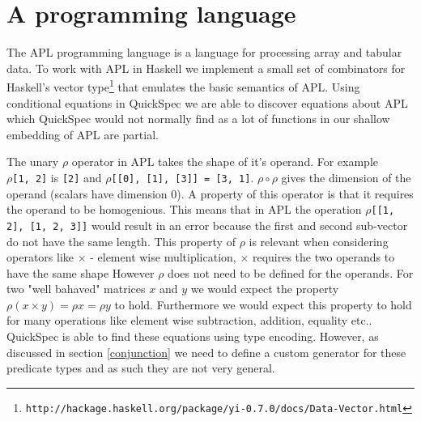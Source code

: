 \section{A programming language}\label{apl}
The APL programming language\cite{Iverson1962}\cite{APLdic}
is a language for processing array and tabular data.
To work with APL in Haskell we implement a small
set of combinators for Haskell's vector
type\footnote{\texttt{http://hackage.haskell.org/package/yi-0.7.0/docs/Data-Vector.html}}
that emulates the basic semantics of APL.
Using conditional equations in QuickSpec we are able to discover
equations about APL which QuickSpec would not
normally find as a lot of functions in our
shallow embedding of APL are partial\cite{Claessen2010}.

The unary $\rho$ operator in APL takes the shape of it's operand.
For example \\$\rho$\texttt{[1, 2]} is \texttt{[2]} and
$\rho$\texttt{[[0], [1], [3]] = [3, 1]}.
$\rho\circ\rho$ gives the dimension of the operand (scalars have dimension 0).
A property of this operator is that it requires the operand to be homogenious.
This means that in APL the operation $\rho$\texttt{[[1, 2], [1, 2, 3]]}
would result in an error because the first and second sub-vector do not have the same length.
This property of $\rho$ is relevant when considering operators like $\times$ - element wise
multiplication, $\times$ requires the two operands to have the same shape
However $\rho$ does not need to be defined for the operands. For two "well bahaved" matrices
$x$ and $y$ we would expect the property $\rho(x \times y) = \rho x = \rho y$ to hold. Furthermore
we would expect this property to hold for many operations like element wise subtraction, addition, equality etc..
QuickSpec is able to find these equations using type encoding. However, as discussed
in section \ref{conjunction} we need to define a custom generator for these predicate types
and as such they are not very general.
